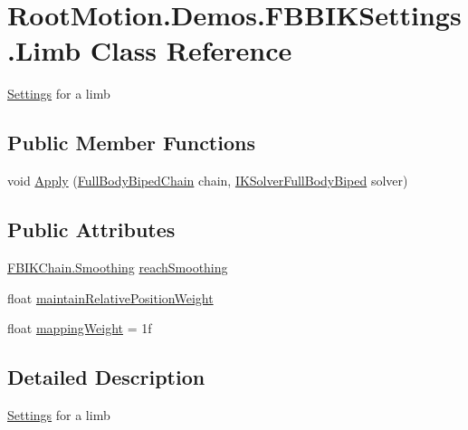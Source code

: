 \hypertarget{class_root_motion_1_1_demos_1_1_f_b_b_i_k_settings_1_1_limb}{}\section{Root\+Motion.\+Demos.\+F\+B\+B\+I\+K\+Settings.\+Limb Class Reference}
\label{class_root_motion_1_1_demos_1_1_f_b_b_i_k_settings_1_1_limb}


\mbox{\hyperlink{class_settings}{Settings}} for a limb  


\subsection*{Public Member Functions}
\begin{DoxyCompactItemize}
\item 
void \mbox{\hyperlink{class_root_motion_1_1_demos_1_1_f_b_b_i_k_settings_1_1_limb_ada4e5f39967caddbfac9ab0ce63b1cde}{Apply}} (\mbox{\hyperlink{namespace_root_motion_1_1_final_i_k_ae8848c0353270a08dcfe8b85a5c9b761}{Full\+Body\+Biped\+Chain}} chain, \mbox{\hyperlink{class_root_motion_1_1_final_i_k_1_1_i_k_solver_full_body_biped}{I\+K\+Solver\+Full\+Body\+Biped}} solver)
\end{DoxyCompactItemize}
\subsection*{Public Attributes}
\begin{DoxyCompactItemize}
\item 
\mbox{\hyperlink{class_root_motion_1_1_final_i_k_1_1_f_b_i_k_chain_a2c75de88180a5922368eaa4c4efb3ac9}{F\+B\+I\+K\+Chain.\+Smoothing}} \mbox{\hyperlink{class_root_motion_1_1_demos_1_1_f_b_b_i_k_settings_1_1_limb_a722ca1f982adaa7797d00329e3b685a4}{reach\+Smoothing}}
\item 
float \mbox{\hyperlink{class_root_motion_1_1_demos_1_1_f_b_b_i_k_settings_1_1_limb_ac3399995bfb74b3de85dd481facc15ab}{maintain\+Relative\+Position\+Weight}}
\item 
float \mbox{\hyperlink{class_root_motion_1_1_demos_1_1_f_b_b_i_k_settings_1_1_limb_ab441d7e7c8ebd2b0ad9396f541759dc6}{mapping\+Weight}} = 1f
\end{DoxyCompactItemize}


\subsection{Detailed Description}
\mbox{\hyperlink{class_settings}{Settings}} for a limb 




